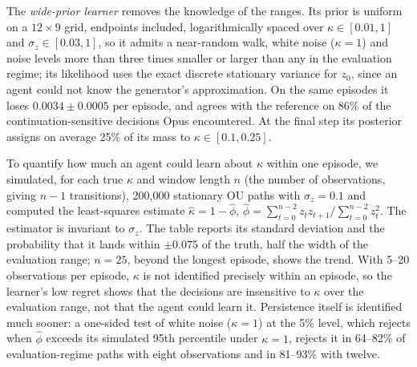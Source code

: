 \documentclass[10pt,a4paper,twocolumn]{article}
\newcommand{\sigz}{\sigma_z}
\begin{document}
The \emph{wide-prior learner} removes the knowledge of the ranges. Its prior is uniform on a $12{\times}9$ grid, endpoints included, logarithmically spaced over $\kappa\in[0.01,1]$ and $\sigz\in[0.03,1]$, so it admits a near-random walk, white noise ($\kappa{=}1$) and noise levels more than three times smaller or larger than any in the evaluation regime; its likelihood uses the exact discrete stationary variance for $z_0$, since an agent could not know the generator's approximation. On the same episodes it loses $0.0034\pm0.0005$ per episode, and agrees with the reference on 86\% of the continuation-sensitive decisions Opus encountered. At the final step its posterior assigns on average 25\% of its mass to $\kappa\in[0.1,0.25]$.

To quantify how much an agent could learn about $\kappa$ within one episode, we simulated, for each true $\kappa$ and window length $n$ (the number of observations, giving $n-1$ transitions), 200{,}000 stationary OU paths with $\sigz=0.1$ and computed the least-squares estimate $\hat\kappa=1-\hat\phi$, $\hat\phi=\sum_{t=0}^{n-2}z_tz_{t+1}/\sum_{t=0}^{n-2}z_t^2$. The estimator is invariant to $\sigz$. The table reports its standard deviation and the probability that it lands within $\pm0.075$ of the truth, half the width of the evaluation range; $n{=}25$, beyond the longest episode, shows the trend. With 5--20 observations per episode, $\kappa$ is not identified precisely within an episode, so the learner's low regret shows that the decisions are insensitive to $\kappa$ over the evaluation range, not that the agent could learn it. Persistence itself is identified much sooner: a one-sided test of white noise ($\kappa{=}1$) at the 5\% level, which rejects when $\hat\phi$ exceeds its simulated 95th percentile under $\kappa{=}1$, rejects it in 64--82\% of evaluation-regime paths with eight observations and in 81--93\% with twelve.
\begin{center}\scriptsize\setlength{\tabcolsep}{2pt}
\end{center}
\end{document}
